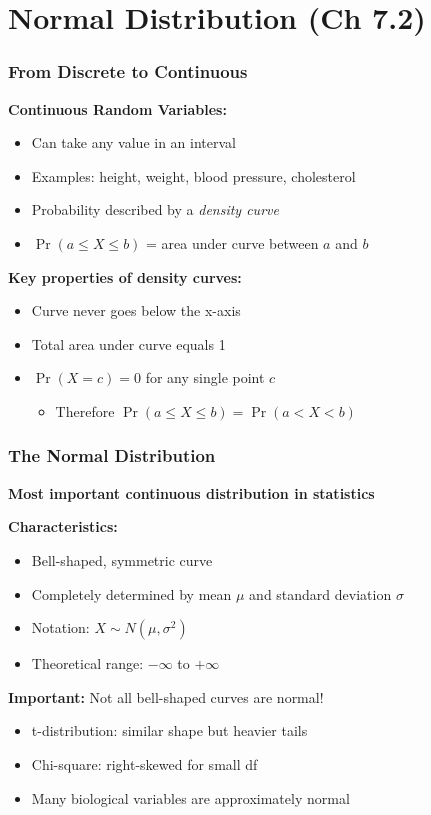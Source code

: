 \documentclass{beamer}
\begin{document}
\section{Normal Distribution (Ch 7.2)}

\begin{frame}
\frametitle{From Discrete to Continuous}
\textbf{Continuous Random Variables:}
\begin{itemize}
\item Can take any value in an interval
\item Examples: height, weight, blood pressure, cholesterol
\item Probability described by a \textit{density curve}
\item $\Pr(a \leq X \leq b)$ = area under curve between $a$ and $b$
\end{itemize}

\vspace{0.5cm}
\textbf{Key properties of density curves:}
\begin{itemize}
\item Curve never goes below the x-axis
\item Total area under curve equals 1
\item $\Pr(X = c) = 0$ for any single point $c$
  \begin{itemize}
  \item Therefore $\Pr(a \leq X \leq b) = \Pr(a < X < b)$
  \end{itemize}
\end{itemize}
\end{frame}

\begin{frame}
\frametitle{The Normal Distribution}
\textbf{Most important continuous distribution in statistics}

\vspace{0.3cm}
\textbf{Characteristics:}
\begin{itemize}
\item Bell-shaped, symmetric curve
\item Completely determined by mean $\mu$ and standard deviation $\sigma$
\item Notation: $X \sim N(\mu, \sigma^2)$
\item Theoretical range: $-\infty$ to $+\infty$
\end{itemize}

\vspace{0.5cm}
\textbf{Important:} Not all bell-shaped curves are normal!
\begin{itemize}
\item t-distribution: similar shape but heavier tails
\item Chi-square: right-skewed for small df
\item Many biological variables are approximately normal
\end{itemize}
\end{frame}
\end{document}
